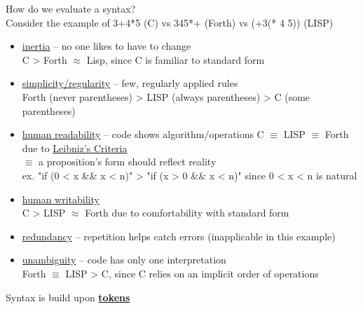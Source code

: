 \documentclass[../../lecture_notes.tex]{subfiles}
\begin{document}
\noindent How do we evaluate a syntax?  \\
Consider the example of 3+4*5 (C) vs 345*+ (Forth) vs (+3(* 4 5)) (LISP)
\begin{itemize} [itemsep=0mm]
	\item \underline{inertia} -- no one likes to have to change\\
		C > Forth $\approx$ Lisp, since C is familiar to standard form
	\item \underline{simplicity/regularity} -- few, regularly applied rules\\
		Forth (never parentheses) > LISP (always parentheses) > C (some parentheses)
	\item \underline{human readability} -- code shows algorithm/operations
		C $\equiv$ LISP $\equiv$ Forth due to \underline{Leibniz's Criteria} \\
		$\equiv$ a proposition's form should reflect reality\\
				ex. "if (0 < x \&\& x < n)" > "if (x > 0 \&\& x < n)" since 0 < x < n is natural
	\item \underline{human writability}\\
		C  > LISP $\approx$ Forth due to comfortability with standard form
	\item \underline{redundancy} -- repetition helps catch errors (inapplicable in this example)
	\item \underline{unambiguity} -- code has only one interpretation\\
		Forth $\equiv$ LISP > C, since C relies on an implicit order of operations
\end{itemize}
Syntax is build upon \textbf{\underline{tokens}}
\end{document}
